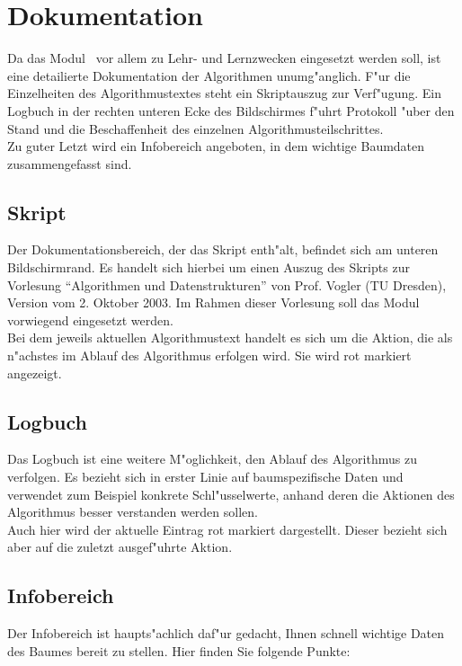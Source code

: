 

\section{Dokumentation}

Da das Modul \AVL \ vor allem zu Lehr- und Lernzwecken eingesetzt werden soll, ist eine detailierte Dokumentation der 
Algorithmen unumg"anglich. F"ur die Einzelheiten des Algorithmustextes steht ein Skriptauszug zur Verf"ugung.
Ein Logbuch in der rechten unteren Ecke des Bildschirmes f"uhrt Protokoll "uber den Stand und die Beschaffenheit
des einzelnen Algorithmusteilschrittes. \\
Zu guter Letzt wird ein Infobereich angeboten, in dem wichtige Baumdaten zusammengefasst sind. \\

\subsection{Skript}
Der Dokumentationsbereich, der das Skript enth"alt, befindet sich am unteren Bildschirmrand. Es handelt sich hierbei 
um einen Auszug des Skripts zur Vorlesung "`Algorithmen und Datenstrukturen"' von Prof. Vogler (TU Dresden), 
Version vom 2. Oktober 2003. Im Rahmen dieser Vorlesung soll das Modul vorwiegend eingesetzt werden. \\
Bei dem jeweils aktuellen Algorithmustext handelt es sich um die Aktion, die als n"achstes im Ablauf des Algorithmus
erfolgen wird. Sie wird rot markiert angezeigt. \\

\subsection{Logbuch}
Das Logbuch ist eine weitere M"oglichkeit, den Ablauf des Algorithmus zu verfolgen. Es bezieht sich in erster Linie auf
baumspezifische Daten und verwendet zum Beispiel konkrete Schl"usselwerte, anhand deren die Aktionen des Algorithmus 
besser verstanden werden sollen. \\
Auch hier wird der aktuelle Eintrag rot markiert dargestellt. Dieser bezieht sich aber auf die zuletzt ausgef"uhrte 
Aktion. \\

\newpage

\subsection{Infobereich}
Der Infobereich ist haupts"achlich daf"ur gedacht, Ihnen schnell wichtige Daten des Baumes bereit zu stellen. Hier finden
Sie folgende Punkte:

